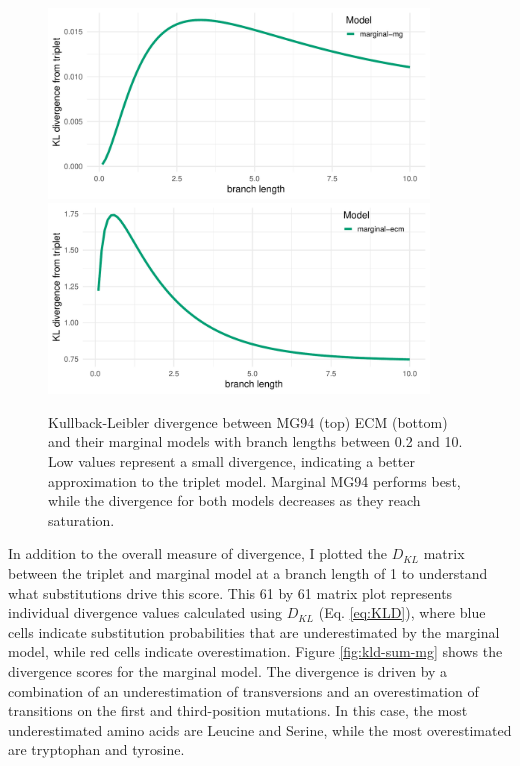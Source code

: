 \begin{figure}[!ht]
    \centering
    \includegraphics[width = 0.9\textwidth]{chapter3/figures/heatmaps/kld_mg.pdf}
    \includegraphics[width = 0.9\textwidth]{chapter3/figures/heatmaps/kld_ecm.pdf}
    \caption[Marginal KL Divergence]{Kullback-Leibler divergence between MG94 (top) ECM (bottom) and their marginal models with branch lengths between 0.2 and 10. Low values represent a small divergence, indicating a better approximation to the triplet model. Marginal MG94 performs best, while the divergence for both models decreases as they reach saturation.}
    \label{fig:kld}
\end{figure}

In addition to the overall measure of divergence, I plotted the $D_{KL}$ matrix between the triplet and marginal model at a branch length of 1 to understand what substitutions drive this score. This 61 by 61 matrix plot represents individual divergence values calculated using $D_{KL}$ (Eq. \ref{eq:KLD}), where blue cells indicate substitution probabilities that are underestimated by the marginal model, while red cells indicate overestimation.
Figure \ref{fig:kld-sum-mg} shows the divergence scores for the marginal model. The divergence is driven by a combination of an underestimation of transversions and an overestimation of transitions on the first and third-position mutations.
In this case, the most underestimated amino acids are Leucine and Serine, while the most overestimated are tryptophan and tyrosine.

